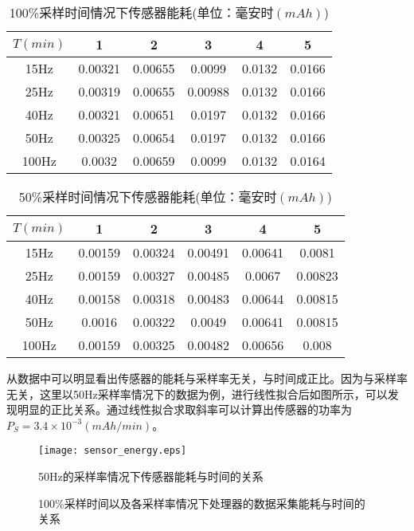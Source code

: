 \begin{table}[htb]
    \centering
    \caption{100\%采样时间情况下传感器能耗(单位：毫安时$(mAh)$)}
    \begin{tabular}{cccccc}
    \toprule
     $T(min)$ & 1 & 2 & 3 & 4 & 5 \\
    \midrule
    15Hz & 0.00321 & 0.00655 & 0.0099 & 0.0132 & 0.0166 \\
    25Hz & 0.00319 & 0.00655 & 0.00988 & 0.0132 & 0.0166 \\
    40Hz & 0.00321 & 0.00651 & 0.0197 & 0.0132 & 0.0166 \\
    50Hz & 0.00325 & 0.00654 & 0.0197 & 0.0132 & 0.0166 \\
    100Hz & 0.0032 & 0.00659 & 0.0099 & 0.0132 & 0.0164 \\
    \bottomrule
    \end{tabular}
 \end{table}

 \begin{table}[htb]
    \centering
    \caption{50\%采样时间情况下传感器能耗(单位：毫安时$(mAh)$)}
    \begin{tabular}{cccccc}
    \toprule
     $T(min)$ & 1 & 2 & 3 & 4 & 5 \\
    \midrule
    15Hz & 0.00159 & 0.00324 & 0.00491 & 0.00641 & 0.0081 \\
    25Hz & 0.00159 & 0.00327 & 0.00485 & 0.0067 & 0.00823 \\
    40Hz & 0.00158 & 0.00318 & 0.00483 & 0.00644 & 0.00815 \\
    50Hz & 0.0016 & 0.00322 & 0.0049 & 0.00641 & 0.00815 \\
    100Hz & 0.00159 & 0.00325 & 0.00482 & 0.00656 & 0.008 \\
    \bottomrule
    \end{tabular}
 \end{table}


\par 从数据中可以明显看出传感器的能耗与采样率无关，与时间成正比。因为与采样率无关，这里以50Hz采样率情况下的数据为例，进行线性拟合后如图所示，可以发现明显的正比关系。通过线性拟合求取斜率可以计算出传感器的功率为$P_S = 3.4 \times 10^{-3} (mAh/min)$。

\begin{figure}[htb]
\centering
\texttt{[image: sensor\_energy.eps]}
\caption{50Hz的采样率情况下传感器能耗与时间的关系}
\end{figure}

\begin{figure}[!htb]
    \centering
    \caption{100\%采样时间以及各采样率情况下处理器的数据采集能耗与时间的关系}
\end{figure}

